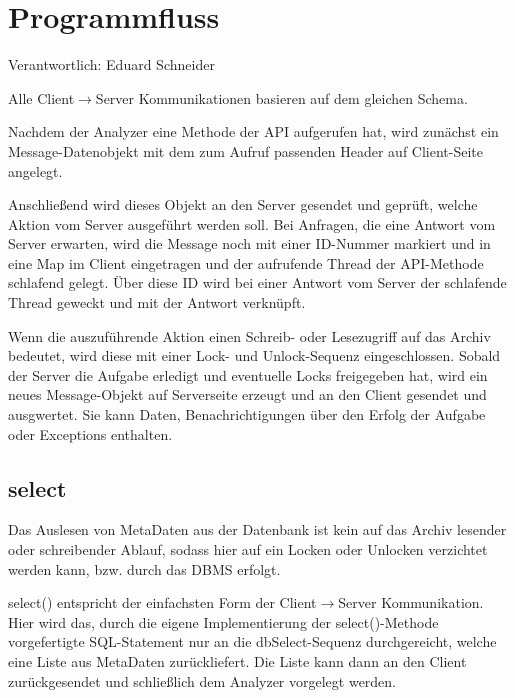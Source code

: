 \section{Programmfluss}

Verantwortlich: Eduard Schneider

Alle Client$\rightarrow$Server Kommunikationen basieren auf dem gleichen Schema.

Nachdem der Analyzer eine Methode der API aufgerufen hat, wird zunächst ein Message-Datenobjekt mit dem zum Aufruf passenden Header auf Client-Seite angelegt.

Anschließend wird dieses Objekt an den Server gesendet und geprüft, welche Aktion vom Server ausgeführt werden soll.
Bei Anfragen, die eine Antwort vom Server erwarten, wird die Message noch mit einer ID-Nummer markiert und in eine Map im Client eingetragen und der aufrufende Thread der API-Methode schlafend gelegt.
Über diese ID wird bei einer Antwort vom Server der schlafende Thread geweckt und mit der Antwort verknüpft.


Wenn die auszuführende Aktion einen Schreib- oder Lesezugriff auf das Archiv bedeutet, wird diese mit einer Lock- und Unlock-Sequenz eingeschlossen.
Sobald der Server die Aufgabe erledigt und eventuelle Locks freigegeben hat, wird ein neues Message-Objekt auf Serverseite erzeugt und an den Client gesendet und ausgwertet.
Sie kann Daten, Benachrichtigungen über den Erfolg der Aufgabe oder Exceptions enthalten.

\subsection {select}

Das Auslesen von MetaDaten aus der Datenbank ist kein auf das Archiv lesender oder schreibender Ablauf, sodass hier auf ein Locken oder Unlocken verzichtet werden kann, bzw. durch das DBMS erfolgt.

select() entspricht der einfachsten Form der Client$\rightarrow$Server Kommunikation.
Hier wird das, durch die eigene Implementierung der select()-Methode vorgefertigte SQL-Statement nur an die dbSelect-Sequenz durchgereicht, welche eine Liste aus MetaDaten zurückliefert.
Die Liste kann dann an den Client zurückgesendet und schließlich dem Analyzer vorgelegt werden.

